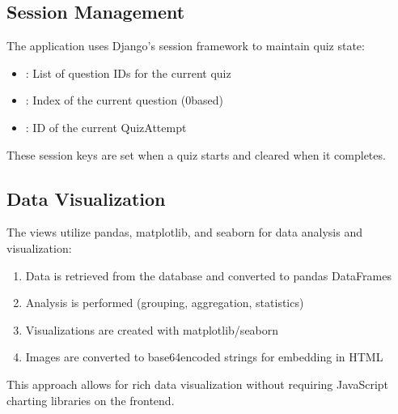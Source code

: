 \documentclass[letterpaper,10pt,english]{sphinxmanual}
\begin{document}
\subsection{Session Management}
\label{\detokenize{views:session-management}}
\sphinxAtStartPar
The application uses Django’s session framework to maintain quiz state:
\begin{itemize}
\item {} 
\sphinxAtStartPar
{}: List of question IDs for the current quiz

\item {} 
\sphinxAtStartPar
{}: Index of the current question (0\sphinxhyphen{}based)

\item {} 
\sphinxAtStartPar
{}: ID of the current QuizAttempt

\end{itemize}

\sphinxAtStartPar
These session keys are set when a quiz starts and cleared when it completes.


\subsection{Data Visualization}
\label{\detokenize{views:data-visualization}}
\sphinxAtStartPar
The views utilize pandas, matplotlib, and seaborn for data analysis and visualization:
\begin{enumerate}
%
\item {} 
\sphinxAtStartPar
Data is retrieved from the database and converted to pandas DataFrames

\item {} 
\sphinxAtStartPar
Analysis is performed (grouping, aggregation, statistics)

\item {} 
\sphinxAtStartPar
Visualizations are created with matplotlib/seaborn

\item {} 
\sphinxAtStartPar
Images are converted to base64\sphinxhyphen{}encoded strings for embedding in HTML

\end{enumerate}

\sphinxAtStartPar
This approach allows for rich data visualization without requiring JavaScript
charting libraries on the frontend.
\end{document}
